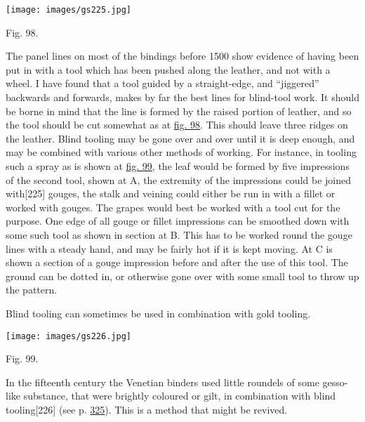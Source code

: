\documentclass[
]{article}
\begin{document}
\protect\hypertarget{Fig_98}{}{}
\texttt{[image: images/gs225.jpg]}

Fig. 98.

The panel lines on most of the bindings before 1500 show evidence of
having been put in with a tool which has been pushed along the leather,
and not with a wheel. I have found that a tool guided by a
straight-edge, and ``jiggered'' backwards and forwards, makes by far the
best lines for blind-tool work. It should be borne in mind that the line
is formed by the raised portion of leather, and so the tool should be
cut somewhat as at \protect\hyperlink{Fig_98}{fig. 98}. This should
leave three ridges on the leather. Blind tooling may be gone over and
over until it is deep enough, and may be combined with various other
methods of working. For instance, in tooling such a spray as is shown at
\protect\hyperlink{Fig_99}{fig. 99}, the leaf would be formed by five
impressions of the second tool, shown at A, the extremity of the
impressions could be joined
with{\protect\hypertarget{Page_225}{}{{[}225{]}}} gouges, the stalk and
veining could either be run in with a fillet or worked with gouges. The
grapes would best be worked with a tool cut for the purpose. One edge of
all gouge or fillet impressions can be smoothed down with some such tool
as shown in section at B. This has to be worked round the gouge lines
with a steady hand, and may be fairly hot if it is kept moving. At C is
shown a section of a gouge impression before and after the use of this
tool. The ground can be dotted in, or otherwise gone over with some
small tool to throw up the pattern.

Blind tooling can sometimes be used in combination with gold tooling.

\protect\hypertarget{Fig_99}{}{}
\texttt{[image: images/gs226.jpg]}

Fig. 99.

In the fifteenth century the Venetian binders used little roundels of
some gesso-like substance, that were brightly coloured or gilt, in
combination with blind
tooling{\protect\hypertarget{Page_226}{}{{[}226{]}}} (see p.
\protect\hyperlink{Page_325}{325}). This is a method that might be
revived.
\end{document}
